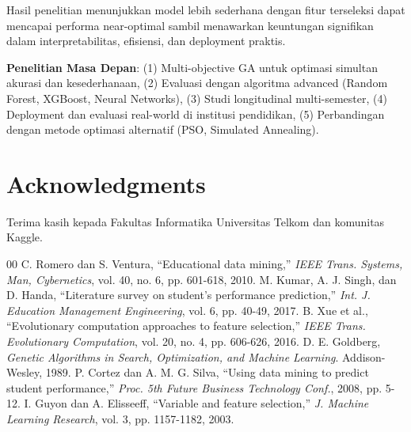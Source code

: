 \documentclass[conference]{IEEEtran}
\begin{document}
Hasil penelitian menunjukkan model lebih sederhana dengan fitur terseleksi dapat mencapai performa near-optimal sambil menawarkan keuntungan signifikan dalam interpretabilitas, efisiensi, dan deployment praktis.

\textbf{Penelitian Masa Depan}: (1) Multi-objective GA untuk optimasi simultan akurasi dan kesederhanaan, (2) Evaluasi dengan algoritma advanced (Random Forest, XGBoost, Neural Networks), (3) Studi longitudinal multi-semester, (4) Deployment dan evaluasi real-world di institusi pendidikan, (5) Perbandingan dengan metode optimasi alternatif (PSO, Simulated Annealing).

\section*{Acknowledgments}
Terima kasih kepada Fakultas Informatika Universitas Telkom dan komunitas Kaggle.

\begin{thebibliography}{00}
 C. Romero dan S. Ventura, ``Educational data mining,'' \textit{IEEE Trans. Systems, Man, Cybernetics}, vol. 40, no. 6, pp. 601-618, 2010.
 M. Kumar, A. J. Singh, dan D. Handa, ``Literature survey on student's performance prediction,'' \textit{Int. J. Education Management Engineering}, vol. 6, pp. 40-49, 2017.
 B. Xue et al., ``Evolutionary computation approaches to feature selection,'' \textit{IEEE Trans. Evolutionary Computation}, vol. 20, no. 4, pp. 606-626, 2016.
 D. E. Goldberg, \textit{Genetic Algorithms in Search, Optimization, and Machine Learning}. Addison-Wesley, 1989.
 P. Cortez dan A. M. G. Silva, ``Using data mining to predict student performance,'' \textit{Proc. 5th Future Business Technology Conf.}, 2008, pp. 5-12.
 I. Guyon dan A. Elisseeff, ``Variable and feature selection,'' \textit{J. Machine Learning Research}, vol. 3, pp. 1157-1182, 2003.
\end{thebibliography}
\end{document}
